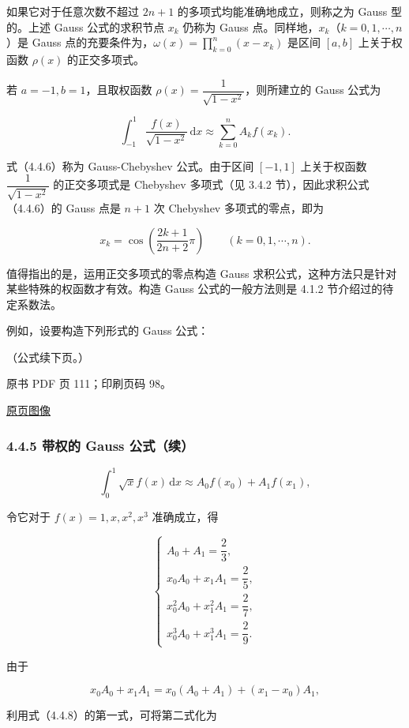 如果它对于任意次数不超过 \(2n+1\) 的多项式均能准确地成立，则称之为 Gauss 型的。上述 Gauss 公式的求积节点 \(x_k\) 仍称为 Gauss 点。同样地，\(x_k\)（\(k=0,1,\cdots,n\)）是 Gauss 点的充要条件为，\(\displaystyle\omega(x)=\prod_{k=0}^{n}(x-x_k)\) 是区间 \([a,b]\) 上关于权函数 \(\rho(x)\) 的正交多项式。

若 \(a=-1,b=1\)，且取权函数 \(\rho(x)=\dfrac1{\sqrt{1-x^2}}\)，则所建立的 Gauss 公式为

\[
\int_{-1}^{1}\frac{f(x)}{\sqrt{1-x^2}}\,\mathrm{d}x
\approx\sum_{k=0}^{n}A_kf(x_k).
\tag{4.4.6}
\]

式（4.4.6）称为 Gauss-Chebyshev 公式。由于区间 \([-1,1]\) 上关于权函数 \(\dfrac1{\sqrt{1-x^2}}\) 的正交多项式是 Chebyshev 多项式（见 3.4.2 节），因此求积公式（4.4.6）的 Gauss 点是 \(n+1\) 次 Chebyshev 多项式的零点，即为

\[
x_k=\cos\left(\frac{2k+1}{2n+2}\pi\right)\qquad(k=0,1,\cdots,n).
\]

值得指出的是，运用正交多项式的零点构造 Gauss 求积公式，这种方法只是针对某些特殊的权函数才有效。构造 Gauss 公式的一般方法则是 4.1.2 节介绍过的待定系数法。

例如，设要构造下列形式的 Gauss 公式：

（公式续下页。）

\clearpage

原书 PDF 页 111；印刷页码 98。

\href{source-images/pdf-111.jpeg}{原页图像}

\subsubsection{4.4.5 带权的 Gauss 公式（续）}\label{ch04b-ux5e26ux6743ux7684-gauss-ux516cux5f0fux7eed}

\[
\int_0^1\sqrt{x}f(x)\,\mathrm{d}x\approx A_0f(x_0)+A_1f(x_1),
\tag{4.4.7}
\]

令它对于 \(f(x)=1,x,x^2,x^3\) 准确成立，得

\[
\begin{cases}
A_0+A_1=\dfrac23,\\[5pt]
x_0A_0+x_1A_1=\dfrac25,\\[5pt]
x_0^2A_0+x_1^2A_1=\dfrac27,\\[5pt]
x_0^3A_0+x_1^3A_1=\dfrac29.
\end{cases}
\tag{4.4.8}
\]

由于

\[
x_0A_0+x_1A_1=x_0(A_0+A_1)+(x_1-x_0)A_1,
\]

利用式（4.4.8）的第一式，可将第二式化为

